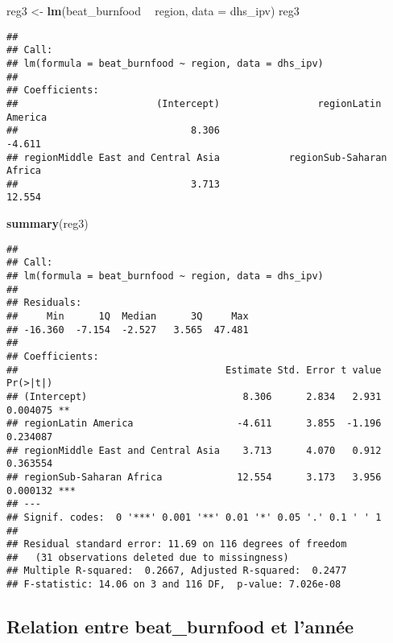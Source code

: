\documentclass[
]{article}
\newenvironment{Shaded}{\begin{snugshade}}{\end{snugshade}}
\newcommand{\DataTypeTok}[1]{\textcolor[rgb]{0.13,0.29,0.53}{#1}}
\newcommand{\KeywordTok}[1]{\textcolor[rgb]{0.13,0.29,0.53}{\textbf{#1}}}
\newcommand{\NormalTok}[1]{#1}
\newcommand{\OperatorTok}[1]{\textcolor[rgb]{0.81,0.36,0.00}{\textbf{#1}}}
\newcommand{\StringTok}[1]{\textcolor[rgb]{0.31,0.60,0.02}{#1}}
\begin{document}
\begin{Shaded}
\begin{Highlighting}[]
\NormalTok{reg3 <-}\StringTok{ }\KeywordTok{lm}\NormalTok{(beat_burnfood }\OperatorTok{~}\StringTok{  }\NormalTok{region, }\DataTypeTok{data =}\NormalTok{ dhs_ipv)}
\NormalTok{reg3}
\end{Highlighting}
\end{Shaded}

\begin{verbatim}
## 
## Call:
## lm(formula = beat_burnfood ~ region, data = dhs_ipv)
## 
## Coefficients:
##                        (Intercept)                 regionLatin America  
##                              8.306                              -4.611  
## regionMiddle East and Central Asia            regionSub-Saharan Africa  
##                              3.713                              12.554
\end{verbatim}

\begin{Shaded}
\begin{Highlighting}[]
\KeywordTok{summary}\NormalTok{(reg3)}
\end{Highlighting}
\end{Shaded}

\begin{verbatim}
## 
## Call:
## lm(formula = beat_burnfood ~ region, data = dhs_ipv)
## 
## Residuals:
##     Min      1Q  Median      3Q     Max 
## -16.360  -7.154  -2.527   3.565  47.481 
## 
## Coefficients:
##                                    Estimate Std. Error t value Pr(>|t|)    
## (Intercept)                           8.306      2.834   2.931 0.004075 ** 
## regionLatin America                  -4.611      3.855  -1.196 0.234087    
## regionMiddle East and Central Asia    3.713      4.070   0.912 0.363554    
## regionSub-Saharan Africa             12.554      3.173   3.956 0.000132 ***
## ---
## Signif. codes:  0 '***' 0.001 '**' 0.01 '*' 0.05 '.' 0.1 ' ' 1
## 
## Residual standard error: 11.69 on 116 degrees of freedom
##   (31 observations deleted due to missingness)
## Multiple R-squared:  0.2667, Adjusted R-squared:  0.2477 
## F-statistic: 14.06 on 3 and 116 DF,  p-value: 7.026e-08
\end{verbatim}

\hypertarget{relation-entre-beat_burnfood-et-lannuxe9e}{%
\subsection{Relation entre beat\_burnfood et
l'année}\label{relation-entre-beat_burnfood-et-lannuxe9e}}
\end{document}
